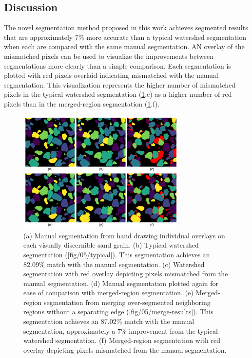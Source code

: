 \subsection{Discussion}
The novel segmentation method proposed in this work achieves segmented results
that are approximately 7\% more accurate than a typical watershed segmentation
when each are compared with the same manual segmentation.
AN overlay of the mismatched pixels can be used to visualize the improvements
between segmentations more clearly than a simple comparison.
Each segmentation is plotted with red pixels overlaid
indicating mismatched with the manual segmentation.
This visualization represents the higher number of mismatched pixels in the
typical watershed segmentation (\ref{fig/05/seg-comps}.c)
as a higher number of red pixels than in the merged-region segmentation
(\ref{fig/05/seg-comps}.f).

\begin{figure}[ht]
    \centering
    \includegraphics[width=0.75\textwidth]{figures/05/09-comps-to-manual.png}
    \caption{
        \small{}
        (a) Manual segmentation from hand drawing individual overlays
        on each visually discernible sand grain.
        (b) Typical watershed segmentation (\ref{fig/05/typical}).
        This segmentation achieves an 82.09\% match with the manual segmentation.
        (c) Watershed segmentation with red overlay depicting pixels mismatched
        from the manual segmentation.
        (d) Manual segmentation plotted again for ease of comparison with
        merged-region segmentation.
        (e) Merged-region segmentation from merging over-segmented
        neighboring regions without a separating edge
        (\ref{fig/05/merge-results}). This segmentation achieves an
        87.02\% match with the manual segmentation, approximately a 7\%
        improvement from the typical watershed segmentation.
        (f) Merged-region segmentation with red overlay depicting
        pixels mismatched from the manual segmentation.
    }
    \label{fig/05/seg-comps}
\end{figure}


